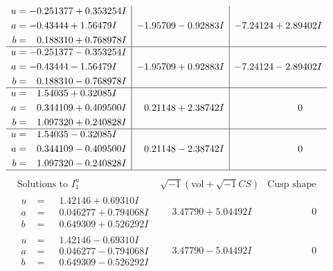 \documentclass[1p]{elsarticle_modified}
\theoremstyle{definition}
\newcommand{\I}{\sqrt{-1}}
\begin{document}
$$\begin{array}{c|c|c}
\begin{aligned}
u &= -0.251377 + 0.353254 I \\
a &= -0.43444 + 1.56479 I \\
b &= \phantom{-}0.188310 + 0.768978 I\end{aligned}
 & -1.95709 - 0.92883 I & -7.24124 + 2.89402 I \\ \hline\begin{aligned}
u &= -0.251377 - 0.353254 I \\
a &= -0.43444 - 1.56479 I \\
b &= \phantom{-}0.188310 - 0.768978 I\end{aligned}
 & -1.95709 + 0.92883 I & -7.24124 - 2.89402 I \\ \hline\begin{aligned}
u &= \phantom{-}1.54035 + 0.32085 I \\
a &= \phantom{-}0.344109 + 0.409500 I \\
b &= \phantom{-}1.097320 + 0.240828 I\end{aligned}
 & \phantom{-}0.21148 + 2.38742 I & \phantom{-0.000000 } 0 \\ \hline\begin{aligned}
u &= \phantom{-}1.54035 - 0.32085 I \\
a &= \phantom{-}0.344109 - 0.409500 I \\
b &= \phantom{-}1.097320 - 0.240828 I\end{aligned}
 & \phantom{-}0.21148 - 2.38742 I & \phantom{-0.000000 } 0\\
 \hline 
 \end{array}$$\newpage$$\begin{array}{c|c|c}  
\text{Solutions to }I^u_{1}& \I (\text{vol} + \sqrt{-1}CS) & \text{Cusp shape}\\
 \hline 
\begin{aligned}
u &= \phantom{-}1.42146 + 0.69310 I \\
a &= \phantom{-}0.046277 + 0.794068 I \\
b &= \phantom{-}0.649309 + 0.526292 I\end{aligned}
 & \phantom{-}3.47790 + 5.04492 I & \phantom{-0.000000 } 0 \\ \hline\begin{aligned}
u &= \phantom{-}1.42146 - 0.69310 I \\
a &= \phantom{-}0.046277 - 0.794068 I \\
b &= \phantom{-}0.649309 - 0.526292 I\end{aligned}
 & \phantom{-}3.47790 - 5.04492 I & \phantom{-0.000000 } 0 \\ \hline\begin{aligned}

\end{aligned}
\end{array}$$
\end{document}
